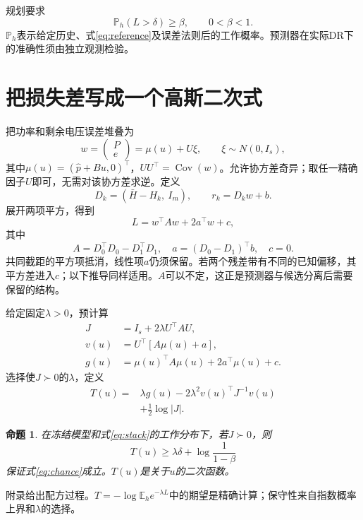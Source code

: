 \documentclass[journal,10pt]{IEEEtran}
\newcommand{\E}{\mathbb E}
\newcommand{\Prob}{\mathbb P}
\newtheorem{proposition}{命题}
\begin{document}
规划要求
\begin{equation}
\Prob_h(L>\delta)\ge\beta,\qquad 0<\beta<1. \label{eq:chance}
\end{equation}
$\Prob_h$表示给定历史、式\eqref{eq:reference}及误差法则后的工作概率。预测器在实际DR下的准确性须由独立观测检验。

\section{把损失差写成一个高斯二次式}
把功率和剩余电压误差堆叠为
\begin{equation}
w=\begin{pmatrix}P\\e\end{pmatrix}
=\mu(u)+U\xi,\qquad \xi\sim N(0,I_s), \label{eq:stack}
\end{equation}
其中$\mu(u)=(\widehat p+Bu,0)^\top$，$UU^\top=\operatorname{Cov}(w)$。允许协方差奇异；取任一精确因子$U$即可，无需对该协方差求逆。定义
\[
D_k=(\bar H-H_k,\ I_m),\qquad r_k=D_kw+b.
\]
展开两项平方，得到
\begin{equation}
L=w^\top Aw+2a^\top w+c, \label{eq:quadratic}
\end{equation}
其中
\begin{equation}
A=D_0^\top D_0-D_1^\top D_1,\quad
a=(D_0-D_1)^\top b,\quad c=0. \label{eq:coefficients}
\end{equation}
共同截距的平方项抵消，线性项$a$仍须保留。若两个残差带有不同的已知偏移，其平方差进入$c$；以下推导同样适用。$A$可以不定，这正是预测器与候选分离后需要保留的结构。

给定固定$\lambda>0$，预计算
\begin{align}
J&=I_s+2\lambda U^\top AU, \label{eq:J}\\
v(u)&=U^\top[A\mu(u)+a], \label{eq:v}\\
g(u)&=\mu(u)^\top A\mu(u)+2a^\top\mu(u)+c. \label{eq:g}
\end{align}
选择使$J\succ0$的$\lambda$，定义
\begin{equation}
\begin{split}
T(u)={}&\lambda g(u)-2\lambda^2v(u)^\top J^{-1}v(u)\\
&+\tfrac12\log|J|.
\end{split} \label{eq:T}
\end{equation}

\begin{proposition}
在冻结模型和式\eqref{eq:stack}的工作分布下，若$J\succ0$，则
\begin{equation}
\boxed{T(u)\ge\lambda\delta+\log\frac1{1-\beta}} \label{eq:certificate}
\end{equation}
保证式\eqref{eq:chance}成立。$T(u)$是关于$u$的二次函数。
\end{proposition}
附录给出配方过程。$T=-\log\E_h e^{-\lambda L}$中的期望是精确计算；保守性来自指数概率上界和$\lambda$的选择。
\end{document}
